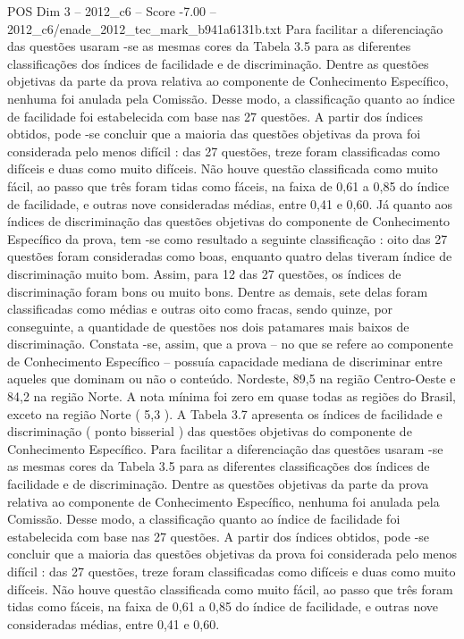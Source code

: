 \begin{textsample}{POS Dim 3 – 2012\_c6 – Score -7.00 – 2012\_c6/enade\_2012\_tec\_mark\_b941a6131b.txt}
Para facilitar a diferenciação das questões usaram -se as mesmas cores da Tabela 3.5 para as diferentes classificações dos índices de facilidade e de discriminação.
Dentre as questões objetivas da parte da prova relativa ao componente de Conhecimento Específico, nenhuma foi anulada pela Comissão.
Desse modo, a classificação quanto ao índice de facilidade foi estabelecida com base nas 27 questões.
A partir dos índices obtidos, pode -se concluir que a maioria das questões objetivas da prova foi considerada pelo menos difícil : das 27 questões, treze foram classificadas como difíceis e duas como muito difíceis.
Não houve questão classificada como muito fácil, ao passo que três foram tidas como fáceis, na faixa de 0,61 a 0,85 do índice de facilidade, e outras nove consideradas médias, entre 0,41 e 0,60.
Já quanto aos índices de discriminação das questões objetivas do componente de Conhecimento Específico da prova, tem -se como resultado a seguinte classificação : oito das 27 questões foram consideradas como boas, enquanto quatro delas tiveram índice de discriminação muito bom.
Assim, para 12 das 27 questões, os índices de discriminação foram bons ou muito bons.
Dentre as demais, sete delas foram classificadas como médias e outras oito como fracas, sendo quinze, por conseguinte, a quantidade de questões nos dois patamares mais baixos de discriminação.
Constata -se, assim, que a prova – no que se refere ao componente de Conhecimento Específico – possuía capacidade mediana de discriminar entre aqueles que dominam ou não o conteúdo.
Nordeste, 89,5 na região Centro-Oeste e 84,2 na região Norte.
A nota mínima foi zero em quase todas as regiões do Brasil, exceto na região Norte ( 5,3 ).
A Tabela 3.7 apresenta os índices de facilidade e discriminação ( ponto bisserial ) das questões objetivas do componente de Conhecimento Específico.
Para facilitar a diferenciação das questões usaram -se as mesmas cores da Tabela 3.5 para as diferentes classificações dos índices de facilidade e de discriminação.
Dentre as questões objetivas da parte da prova relativa ao componente de Conhecimento Específico, nenhuma foi anulada pela Comissão.
Desse modo, a classificação quanto ao índice de facilidade foi estabelecida com base nas 27 questões.
A partir dos índices obtidos, pode -se concluir que a maioria das questões objetivas da prova foi considerada pelo menos difícil : das 27 questões, treze foram classificadas como difíceis e duas como muito difíceis.
Não houve questão classificada como muito fácil, ao passo que três foram tidas como fáceis, na faixa de 0,61 a 0,85 do índice de facilidade, e outras nove consideradas médias, entre 0,41 e 0,60.

\end{textsample}
